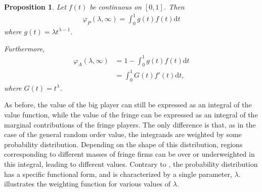 \documentclass[a4paper]{article}
\newtheorem{proposition}{Proposition}
\newcommand{\dt}{\mathrm{d}t}
\begin{document}
\begin{proposition}
    \label{prop:one_sided_weighted}
    Let $f(t)$ be continuous on $[0, 1]$. Then
    \begin{align*}
        \varphi_P(\lambda, \infty) = \int_0^1 g(t) f(t) \dt
    \end{align*}
    where $g(t) = \lambda t^{\lambda - 1}$.

    Furthermore,
    \begin{align*}
        \varphi_A(\lambda, \infty) &= 1 - \int_0^1 g(t) f(t) \dt \\
                                   &= \int_0^1 G(t) f'(t) \dt,
    \end{align*}
    where $G(t) = t^\lambda$.
\end{proposition}

As before, the value of the big player can still be expressed as an integral of the value function, while the value of the fringe can be expressed as an integral of the marginal contributions of the fringe players.
The only difference is that, as in the case of the general random order value, the integrands are weighted by some probability distribution.
Depending on the shape of this distribution, regions corresponding to different masses of fringe firms can be over or underweighted in this integral, leading to different values.
Contrary to , the probability distribution has a specific functional form, and is characterized by a single parameter, $\lambda$.
 illustrates the weighting function for various values of $\lambda$.
\end{document}
